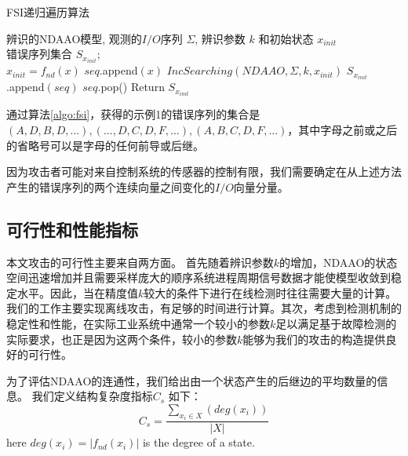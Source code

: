 \renewcommand{\algorithmicrequire}{\textbf{输入:}}
\renewcommand{\algorithmicensure}{\textbf{输出:}}
\begin{algorithm}[h]
  \caption{FSI递归遍历算法}
  \label{algo:fsi}
  \begin{algorithmic}[1]
    \REQUIRE %
    辨识的NDAAO模型, 观测的$I/O$序列 $\varSigma$, 辨识参数 $k$ 和初始状态 $x_{init}$ \\  
    
    \ENSURE %
    错误序列集合 $S_{x_{init}}$;  \\
      \STATE $x_{init}=f_{nd}(x)$
      \STATE $seq$.append$(x)$
      \STATE $IncSearching(NDAAO,\varSigma,k,x_{init})$
        \STATE $S_{x_{init}}$.append$(seq)$
      \ENDIF
      \STATE $seq$.pop()
    \ENDFOR
    \STATE Return $S_{x_{init}}$
  \end{algorithmic}
\end{algorithm}

通过算法\ref{algo:fsi}，获得的示例1的错误序列的集合是${(A,D,B,D,...),(...,D,C,D,F,...),(A,B,C,D,F,...)}$，其中字母之前或之后的省略号可以是字母的任何前导或后继。

因为攻击者可能对来自控制系统的传感器的控制有限，我们需要确定在从上述方法产生的错误序列的两个连续向量之间变化的$I/O$向量分量。

\subsection{可行性和性能指标}

本文攻击的可行性主要来自两方面。 首先随着辨识参数$ k $的增加，NDAAO的状态空间迅速增加并且需要采样庞大的顺序系统进程周期信号数据才能使模型收敛到稳定水平\parencite{klein2005}。因此，当在精度值$ k $较大的条件下进行在线检测时往往需要大量的计算。 我们的工作主要实现离线攻击，有足够的时间进行计算。其次，考虑到检测机制的稳定性和性能，在实际工业系统中通常一个较小的参数$ k $足以满足基于故障检测的实际要求\parencite{roth2012}，也正是因为这两个条件，较小的参数$ k $能够为我们的攻击的构造提供良好的可行性。

为了评估NDAAO的连通性，我们给出由一个状态产生的后继边的平均数量的信息。 我们定义结构复杂度指标$ C_s $ 如下：
\begin{equation}
C_s= \dfrac{\sum_{x_i\in X} (deg(x_i))}{|X|} 
\end{equation} here $deg(x_i)=|f_{nd}(x_i)|$ is the degree of a state.

